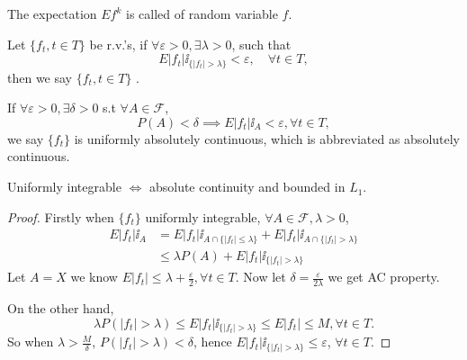 The expectation $Ef^k$ is called  of random variable $f$.

\begin{definition}
	Let $ \{f_t, t\in T\}$ be r.v.'s,
	if $\forall \varepsilon >0, \exists \lambda >0$, such that
	\[
		E|f_t|\ii_{\{|f_t| > \lambda\}} < \varepsilon, \quad \forall t\in T,
	\]
	then we say $\{f_t, t\in T\}$ .
\end{definition}

If $\forall \varepsilon>0, \exists \delta>0$ s.t $\forall A\in \mathscr{F}$,
\[
P(A)<\delta \implies E|f_t|\ii_A < \varepsilon, \forall t\in T,
\]
we say $\{f_t\}$ is uniformly absolutely continuous, which is abbreviated as
absolutely continuous.

\begin{theorem}
    Uniformly integrable $\iff$ absolute continuity and bounded in $L_1$.
\end{theorem}
\begin{proof}[Proof]
    Firstly when $\{f_t\}$ uniformly integrable,
	$\forall A\in \mathscr{F}, \lambda>0$,
	\begin{align*}
	E|f_t|\ii_A &= E|f_t|\ii_{A\cap \{|f_t|\le \lambda\}}
	+ E|f_t|\ii_{A\cap \{|f_t|>\lambda\}}\\
	&\le \lambda P(A) + E|f_t|\ii_{\{|f_t|>\lambda\}}
	\end{align*}
	Let $A = X$ we know $E|f_t| \le \lambda + \frac{\varepsilon}{2},
	\forall t\in T$.
	Now let $\delta = \frac{\varepsilon}{2\lambda}$ we get AC property.

	On the other hand,
	\[
	\lambda P(|f_t|>\lambda) \le E|f_t|\ii_{\{|f_t|>\lambda\}}\le E|f_t|\le M,
	\forall t\in T.
	\]
	So when $\lambda > \frac{M}{\delta}$, $P(|f_t|>\lambda) < \delta$,
	hence $E|f_t|\ii_{\{|f_t|>\lambda\}}\le \varepsilon$, $\forall t\in T$.
\end{proof}

